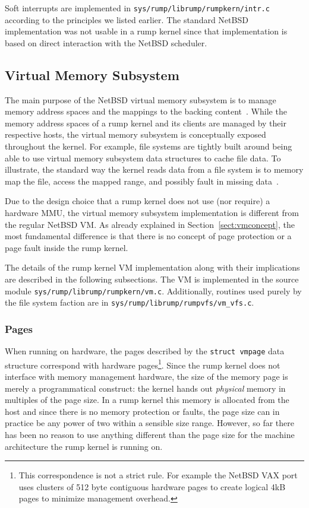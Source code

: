 Soft interrupts are implemented in
\texttt{sys/rump/librump/rumpkern/intr.c} according to the principles
we listed earlier.  The standard NetBSD implementation was not
usable in a rump kernel since that implementation is based on direct
interaction with the NetBSD scheduler.


\subsection{Virtual Memory Subsystem}

The main purpose of the NetBSD virtual memory subsystem is to manage
memory address spaces and the mappings to the backing
content~\cite{cranor:uvm}.  While the memory address spaces of a
rump kernel and its clients are managed by their respective hosts,
the virtual memory subsystem is conceptually exposed throughout
the kernel.  For example, file systems are tightly built around
being able to use virtual memory subsystem data structures to cache
file data.  To illustrate, the standard way the kernel reads data
from a file system is to memory map the file, access the mapped
range, and possibly fault in missing data~\cite{silvers:ubc}.

Due to the design choice that a rump kernel does not use (nor
require) a hardware MMU, the virtual memory subsystem implementation
is different from the regular NetBSD VM.  As already
explained in Section~\ref{sect:vmconcept}, the most fundamental
difference is that there is no concept of page protection or a
page fault inside the rump kernel.

The details of the rump kernel VM implementation along with their
implications are described in the following subsections.
The VM is implemented in the source module
\verb+sys/rump/librump/rumpkern/vm.c+.  Additionally, routines used
purely by the file system faction are in
\verb+sys/rump/librump/rumpvfs/vm_vfs.c+.

\subsubsection*{Pages}

When running on hardware, the pages described by the \texttt{struct
vmpage} data structure correspond with hardware pages\footnote{
	This correspondence is not a strict rule.  For example the NetBSD VAX port
	uses clusters of 512 byte contiguous hardware pages to
	create logical 4kB pages to minimize management
	overhead.
}.
Since the rump kernel does not interface with  memory management
hardware, the size of the memory page is merely a programmatical
construct: the kernel hands out \textit{physical} memory in multiples
of the page size.  In a rump kernel this memory is allocated from
the host and since there is no memory
protection or faults, the page size can in practice be any power
of two within a sensible size range.  However, so far there has
been no reason to use anything different than the page size for
the machine architecture the rump kernel is running on.

